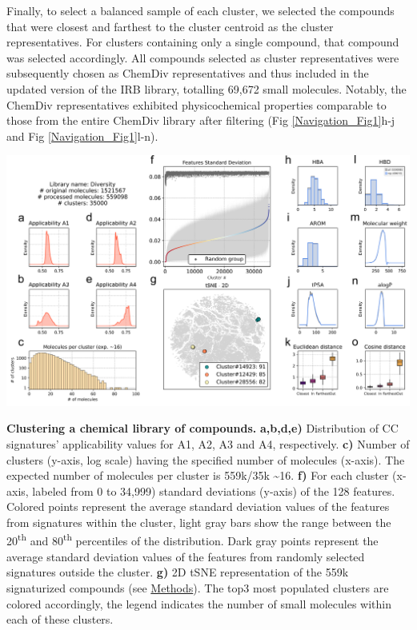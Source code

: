 Finally, to select a balanced sample of each cluster, we selected the compounds that were closest and farthest to the cluster centroid as the cluster representatives. For clusters containing only a single compound, that compound was selected accordingly. All compounds selected as cluster representatives were subsequently chosen as ChemDiv representatives and thus included in the updated version of the IRB library, totalling 69,672 small molecules. Notably, the ChemDiv representatives exhibited physicochemical properties comparable to those from the entire ChemDiv library after filtering (Fig \ref{Navigation_Fig1}h-j and Fig \ref{Navigation_Fig1}l-n). 


\begin{Figure_modified}
  \centering
  \includegraphics[width=1\linewidth]{figures/Navigation/Main/Diversity_random_v3.png}
  \caption{\textbf{Clustering a chemical library of compounds.}
    \textbf{a,b,d,e)} Distribution of CC signatures’ applicability values for A1, A2, A3 and A4, respectively. 
    \textbf{c)} Number of clusters (y-axis, log scale) having the specified number of molecules (x-axis). The expected number of molecules per cluster is 559k/35k \textasciitilde 16.
    \textbf{f)} For each cluster (x-axis, labeled from 0 to 34,999) standard deviations (y-axis) of the 128 features. Colored points represent the average standard deviation values of the features from signatures within the cluster, light gray bars show the range between the 20\textsuperscript{th} and 80\textsuperscript{th} percentiles of the distribution. Dark gray points represent the average standard deviation values of the features from randomly selected signatures outside the cluster.
    \textbf{g)} 2D tSNE representation of the 559k signaturized compounds (see \hyperref[Navigation_Methods]{Methods}). The top3 most populated clusters are colored accordingly, the legend indicates the number of small molecules within each of these clusters.
}
\end{Figure_modified}
